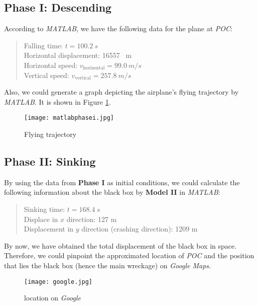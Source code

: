\documentclass[a4paper,11pt]{article}
\begin{document}
\begin{spacing}{1.0}
\subsection{Phase I: Descending}\label{Phase I}
According to \textit{MATLAB}, we have the following data for the plane at \textit{POC}:
\begin{quote}
	Falling time: $t = 100.2 ~\unit{s}$
	\\Horizontal displacement: 16557 ~\unit{m}
	\\Horizontal speed: $v_\text{horizontal} = 99.0 ~\unit{m/s}$
	\\Vertical speed: $v_\text{vertical} = 257.8 ~\unit{m/s}$
\end{quote}
Also, we could generate a graph depicting the airplane's flying trajectory by \textit{MATLAB}. It is shown in Figure \ref{trajector}.
\begin{figure}[H]
	\centering
	\texttt{[image: matlabphasei.jpg]}
	\caption{Flying trajectory}\label{trajector}
\end{figure}
\subsection{Phase II: Sinking}\label{Phase II}
By using the data from \textbf{Phase I} as initial conditions, we could calculate the following information about the black box by \textbf{Model II} in \textit{MATLAB}:
\begin{quote}
	Sinking time: $t = 168.4$ \unit{s}
	\\Displace in $x$ direction: 127 \unit{m}
	\\Displacement in $y$ direction (crashing direction): 1209 \unit{m}
\end{quote}
$$$$
By now, we have obtained the total displacement of the black box in space. Therefore, we could pinpoint the approximated location of \textit{POC} and the position that lies the black box (hence the main wreckage) on \textit{Google Maps}.
\begin{figure}[H]
	\centering
	\texttt{[image: google.jpg]}
	\caption{location on \textit{Google}\cite{google}}
\end{figure}


\end{spacing}
\end{document}
